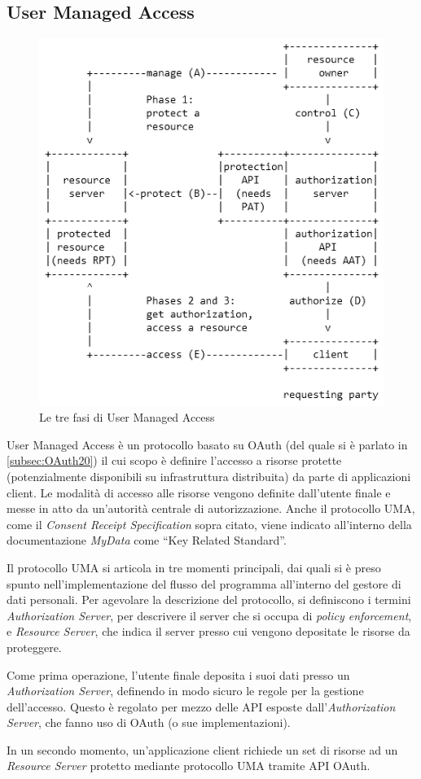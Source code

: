 \subsection{User Managed Access}
\begin{figure} [h]
	\centering
	\includegraphics[width=0.5\linewidth]{pictures/UMAPhases.png}
	\caption{Le tre fasi di User Managed Access}
	\label{fig:UMAPhases}
\end{figure}
User Managed Access \cite{uma} \`e un protocollo basato su OAuth (del quale si \`e parlato in \ref{subsec:OAuth20}) il cui scopo \`e definire l’accesso a risorse protette (potenzialmente disponibili su infrastruttura distribuita) da parte di applicazioni client. Le modalit\`a di accesso alle risorse vengono definite dall’utente finale e messe in atto da un’autorit\`a centrale di autorizzazione. Anche il protocollo UMA, come il \textit{Consent Receipt Specification} sopra citato, viene indicato all’interno della documentazione \textit{MyData} come “Key Related Standard”.

Il protocollo UMA si articola in tre momenti principali, dai quali si \`e preso spunto nell’implementazione del flusso del programma all’interno del gestore di dati personali. Per agevolare la descrizione del protocollo, si definiscono i termini \textit{Authorization Server}, per descrivere il server che si occupa di \textit{policy enforcement}, e \textit{Resource Server}, che indica il server presso cui vengono depositate le risorse da proteggere.

Come prima operazione, l’utente finale deposita i suoi dati presso un \textit{Authorization Server}, definendo in modo sicuro le regole per la gestione dell’accesso. Questo \`e regolato per mezzo delle API esposte dall’\textit{Authorization Server}, che fanno uso di OAuth (o sue implementazioni).

In un secondo momento, un'applicazione client richiede un set di risorse ad un \textit{Resource Server} protetto mediante protocollo UMA tramite API OAuth. 

